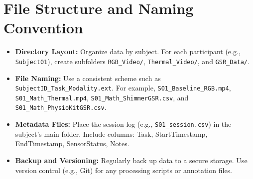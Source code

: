 \documentclass{article}
\begin{document}
\section{File Structure and Naming Convention}
\begin{itemize}
    \item \textbf{Directory Layout:} Organize data by subject. For each participant (e.g., \texttt{Subject01}), create subfolders \texttt{RGB\_Video/}, \texttt{Thermal\_Video/}, and \texttt{GSR\_Data/}.
    \item \textbf{File Naming:} Use a consistent scheme such as \texttt{SubjectID\_Task\_Modality.ext}. For example, \texttt{S01\_Baseline\_RGB.mp4}, \texttt{S01\_Math\_Thermal.mp4}, \texttt{S01\_Math\_ShimmerGSR.csv}, and \texttt{S01\_Math\_PhysioKitGSR.csv}.
    \item \textbf{Metadata Files:} Place the session log (e.g., \texttt{S01\_session.csv}) in the subject’s main folder. Include columns: Task, StartTimestamp, EndTimestamp, SensorStatus, Notes.
    \item \textbf{Backup and Versioning:} Regularly back up data to a secure storage. Use version control (e.g., Git) for any processing scripts or annotation files.
\end{itemize}
\end{document}
